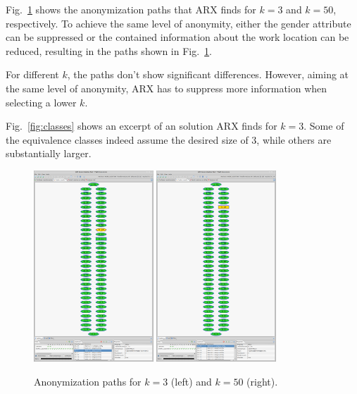 \documentclass[parskip=full]{scrartcl}
\begin{document}
Fig.~\ref{fig:paths} shows the anonymization paths that ARX finds for $k=3$ and $k=50$, respectively. To achieve the same level of anonymity, either the gender attribute can be suppressed or the contained information about the work location can be reduced, resulting in the paths shown in Fig.~\ref{fig:paths}.

For different $k$, the paths don't show significant differences. However, aiming at the same level of anonymity, ARX has to suppress more information when selecting a lower $k$.

Fig.~\ref{fig:classes} shows an excerpt of an solution ARX finds for $k=3$. Some of the equivalence classes indeed assume the desired size of 3, while others are substantially larger.

\begin{figure}
\centering
\includegraphics[trim=10cm 9cm 10cm 4.4cm, clip,width=0.4\textwidth]{figures/k=3_paths.png}
\includegraphics[trim=10cm 9cm 10cm 4.4cm, clip,width=0.4\textwidth]{figures/k=50_paths.png}
\caption{Anonymization paths for $k=3$ (left) and $k=50$ (right).}
\label{fig:paths}
\end{figure}


\end{document}
